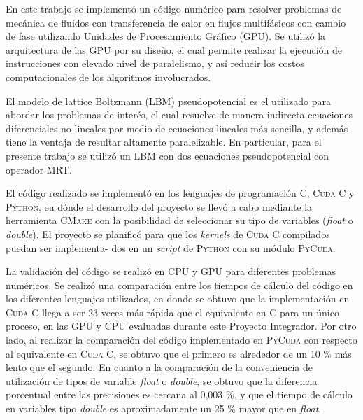 \begin{resumen}%

En este trabajo se implementó un código numérico para resolver problemas de mecánica de fluidos con transferencia de calor en flujos multifásicos con cambio de fase utilizando Unidades de Procesamiento Gráfico (GPU). Se utilizó la arquitectura de las GPU por su diseño, el cual permite realizar la ejecución de instrucciones con elevado nivel de paralelismo, y así reducir los costos computacionales de los algoritmos involucrados.

El modelo de lattice Boltzmann (LBM) pseudopotencial es el utilizado para abordar los problemas de interés, el cual resuelve de manera indirecta ecuaciones diferenciales no lineales por medio de ecuaciones lineales más sencilla, y además tiene la ventaja de resultar altamente paralelizable. En particular, para el presente trabajo se utilizó un LBM con dos ecuaciones pseudopotencial con operador MRT.

El código realizado se implementó en los lenguajes de programación \textsc{C}, \textsc{Cuda C} y \textsc{Python}, en dónde el desarrollo del proyecto se llevó a cabo mediante la herramienta \textsc{CMake} con la posibilidad de seleccionar su tipo de variables (\textit{float} o \textit{double}). El proyecto se planificó para que los \textit{kernels} de \textsc{Cuda C} compilados puedan ser implementa- dos en un \textit{script} de \textsc{Python} con su módulo \textsc{PyCuda}.

La validación del código se realizó en CPU y GPU para diferentes problemas numéricos. Se realizó una comparación entre los tiempos de cálculo del código en los diferentes lenguajes utilizados, en donde se obtuvo que la implementación en \textsc{Cuda C} llega a ser 23 veces más rápida que el equivalente en \textsc{C} para un único proceso, en las GPU y CPU evaluadas durante este Proyecto Integrador. Por otro lado, al realizar la comparación del código implementado en \textsc{PyCuda} con respecto al equivalente en \textsc{Cuda C}, se obtuvo que el primero es alrededor de un 10 \% más lento que el segundo. En cuanto a la comparación de la conveniencia de utilización de tipos de variable \textit{float} o \textit{double}, se obtuvo que la diferencia porcentual entre las  precisiones es cercana al 0,003 \%, y que el tiempo de cálculo en variables tipo \textit{double} es aproximadamente un 25 \% mayor que en \textit{float}.



\end{resumen}

